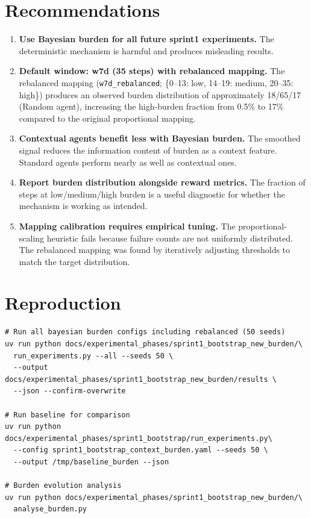 \documentclass[11pt,a4paper]{article}
\begin{document}
\section{Recommendations}

\begin{enumerate}
  \item \textbf{Use Bayesian burden for all future sprint1 experiments.}
    The deterministic mechanism is harmful and produces misleading
    results.
  \item \textbf{Default window: w7d (35 steps) with rebalanced mapping.}
    The rebalanced mapping (\texttt{w7d\_rebalanced};
    \{0--13: low, 14--19: medium, 20--35: high\})
    produces an observed burden distribution of approximately 18/65/17
    (Random agent), increasing the high-burden fraction from 0.5\% to
    17\% compared to the original proportional mapping.
  \item \textbf{Contextual agents benefit less with Bayesian burden.}
    The smoothed signal reduces the information content of burden as a
    context feature.  Standard agents perform nearly as well as
    contextual ones.
  \item \textbf{Report burden distribution alongside reward metrics.}
    The fraction of steps at low/medium/high burden is a useful
    diagnostic for whether the mechanism is working as intended.
  \item \textbf{Mapping calibration requires empirical tuning.}
    The proportional-scaling heuristic fails because failure counts are
    not uniformly distributed.  The rebalanced mapping was found by
    iteratively adjusting thresholds to match the target distribution.
\end{enumerate}

\section{Reproduction}

\begin{verbatim}
# Run all bayesian burden configs including rebalanced (50 seeds)
uv run python docs/experimental_phases/sprint1_bootstrap_new_burden/\
  run_experiments.py --all --seeds 50 \
  --output docs/experimental_phases/sprint1_bootstrap_new_burden/results \
  --json --confirm-overwrite

# Run baseline for comparison
uv run python docs/experimental_phases/sprint1_bootstrap/run_experiments.py\
  --config sprint1_bootstrap_context_burden.yaml --seeds 50 \
  --output /tmp/baseline_burden --json

# Burden evolution analysis
uv run python docs/experimental_phases/sprint1_bootstrap_new_burden/\
  analyse_burden.py
\end{verbatim}
\end{document}
